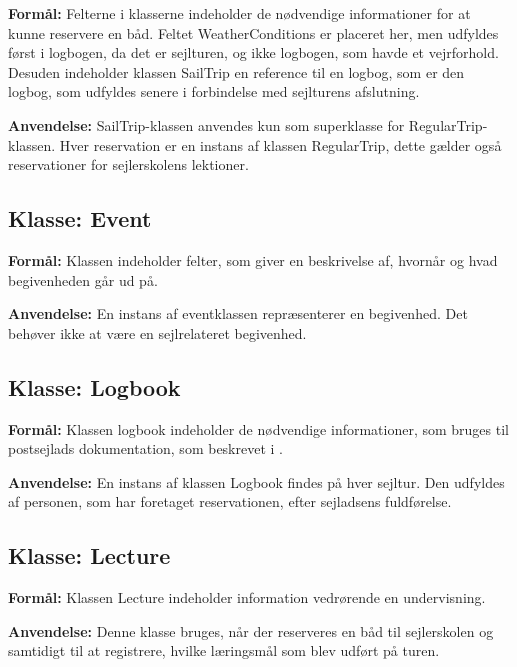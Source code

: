 \textbf{Formål:}
Felterne i klasserne indeholder de nødvendige informationer for at kunne reservere en båd.
Feltet WeatherConditions er placeret her, men udfyldes først i logbogen, da det er sejlturen, og ikke logbogen, som havde et vejrforhold.
Desuden indeholder klassen SailTrip en reference til en logbog, som er den logbog, som udfyldes senere i forbindelse med sejlturens afslutning.

\textbf{Anvendelse:}
SailTrip-klassen anvendes kun som superklasse for RegularTrip-klassen. 
Hver reservation er en instans af klassen RegularTrip, dette gælder også reservationer for sejlerskolens lektioner.

\subsection*{Klasse: Event}

\textbf{Formål:} 
Klassen indeholder felter, som giver en beskrivelse af, hvornår og hvad begivenheden går ud på. 

\textbf{Anvendelse:}
En instans af eventklassen repræsenterer en begivenhed. 
Det behøver ikke at være en sejlrelateret begivenhed.

\subsection*{Klasse: Logbook}

\textbf{Formål:}
Klassen logbook indeholder de nødvendige informationer, som bruges til postsejlads dokumentation, som beskrevet i .

\textbf{Anvendelse:}
En instans af klassen Logbook findes på hver sejltur. 
Den udfyldes af personen, som har foretaget reservationen, efter sejladsens fuldførelse. 

\subsection*{Klasse: Lecture}

\textbf{Formål:}
Klassen Lecture indeholder information vedrørende en undervisning. 

\textbf{Anvendelse:}
Denne klasse bruges, når der reserveres en båd til sejlerskolen og samtidigt til at registrere, hvilke læringsmål som blev udført på turen. 
